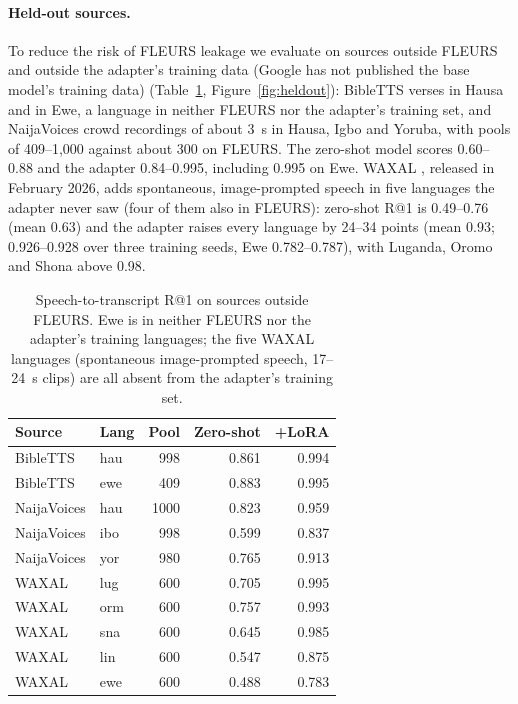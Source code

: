 \documentclass[conference]{IEEEtran}
\makeatletter
\newcommand{\rone}{R@1}
\makeatother
\begin{document}
\paragraph{Held-out sources.}
To reduce the risk of FLEURS leakage we evaluate on sources outside FLEURS and outside the adapter's training data (Google has not published the base model's training data) (Table~\ref{tab:heldout}, Figure~\ref{fig:heldout}): BibleTTS verses in
Hausa and in Ewe, a language in neither FLEURS nor the adapter's training set,
and NaijaVoices crowd recordings of about 3~s in Hausa, Igbo and Yoruba, with pools of 409--1,000 against about 300 on FLEURS. The zero-shot model scores
0.60--0.88 and the adapter 0.84--0.995, including 0.995 on Ewe. WAXAL
\cite{waxal2026}, released in February 2026, adds spontaneous, image-prompted speech
in five languages the adapter never saw (four of them also in FLEURS): zero-shot \rone{} is 0.49--0.76
(mean 0.63) and the adapter raises every language by 24--34 points (mean
0.93; 0.926--0.928 over three training seeds, Ewe 0.782--0.787), with Luganda, Oromo and Shona above 0.98.

\begin{table}[t]
  \centering
  \caption{Speech-to-transcript \rone{} on sources outside FLEURS. Ewe is in
  neither FLEURS nor the adapter's training languages; the five WAXAL
  languages (spontaneous image-prompted speech, 17--24~s clips) are all absent from the
  adapter's training set.}
  \label{tab:heldout}
  \small
  \begin{tabular}{llrrr}
    \toprule
    Source & Lang & Pool & Zero-shot & +LoRA \\
    \midrule
    BibleTTS    & hau & 998  & 0.861 & 0.994 \\
    BibleTTS    & ewe & 409  & 0.883 & 0.995 \\
    NaijaVoices & hau & 1000 & 0.823 & 0.959 \\
    NaijaVoices & ibo & 998  & 0.599 & 0.837 \\
    NaijaVoices & yor & 980  & 0.765 & 0.913 \\
    \midrule
    WAXAL       & lug & 600 & 0.705 & 0.995 \\
    WAXAL       & orm & 600 & 0.757 & 0.993 \\
    WAXAL       & sna & 600 & 0.645 & 0.985 \\
    WAXAL       & lin & 600 & 0.547 & 0.875 \\
    WAXAL       & ewe & 600 & 0.488 & 0.783 \\
    \bottomrule
  \end{tabular}
\end{table}
\end{document}
